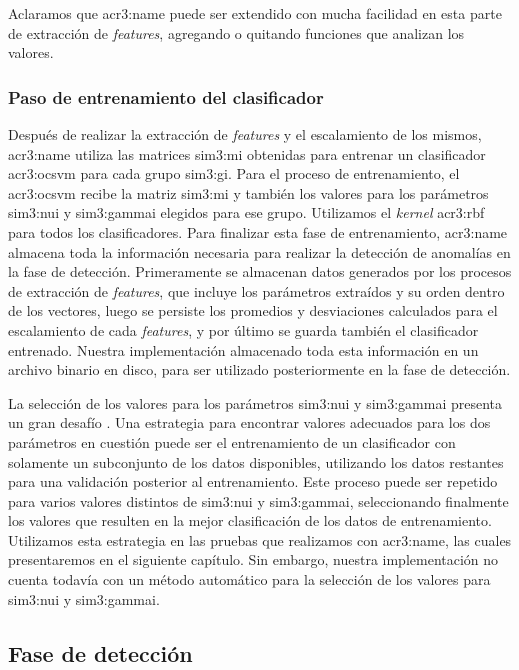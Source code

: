 Aclaramos que \gls{acr3:name} puede ser extendido con mucha facilidad
en esta parte de extracción de \textit{features}, agregando o quitando
funciones que analizan los valores.


\subsubsection{Paso de entrenamiento del clasificador}

Después de realizar la extracción de \textit{features} y el escalamiento
de los mismos, \gls{acr3:name} utiliza las matrices \gls{sim3:mi} obtenidas
para entrenar un clasificador \gls{acr3:ocsvm} para cada grupo \gls{sim3:gi}.
Para el proceso de entrenamiento, el \gls{acr3:ocsvm} recibe la matriz
\gls{sim3:mi} y también los valores para los parámetros \gls{sim3:nui}
y \gls{sim3:gammai} elegidos para ese grupo.
Utilizamos el \textit{kernel} \gls{acr3:rbf} para todos los clasificadores.
Para finalizar esta fase de entrenamiento, \gls{acr3:name} almacena toda
la información necesaria para realizar la detección de anomalías en la
fase de detección. Primeramente se almacenan datos generados por los procesos
de extracción de \textit{features}, que incluye los parámetros extraídos
y su orden dentro de los vectores, luego se persiste los promedios y
desviaciones calculados para el escalamiento de cada \textit{features},
y por último se guarda también el clasificador entrenado.
Nuestra implementación almacenado toda esta información en un archivo
binario en disco, para ser utilizado posteriormente en la fase de detección.

La selección de los valores para los parámetros \gls{sim3:nui} y
\gls{sim3:gammai} presenta un gran desafío
\cite{khan2009survey}. %
Una estrategia para encontrar valores adecuados para los dos parámetros
en cuestión puede ser el entrenamiento de un clasificador con solamente
un subconjunto de los datos disponibles, utilizando los datos restantes
para una validación posterior al entrenamiento. Este proceso puede ser
repetido para varios valores distintos de \gls{sim3:nui} y \gls{sim3:gammai},
seleccionando finalmente los valores que resulten en la mejor clasificación
de los datos de entrenamiento.
Utilizamos esta estrategia en las pruebas que realizamos con \gls{acr3:name},
las cuales presentaremos en el siguiente capítulo. Sin embargo, nuestra
implementación no cuenta todavía con un método automático para la selección
de los valores para \gls{sim3:nui} y \gls{sim3:gammai}.


\subsection{Fase de detección}

